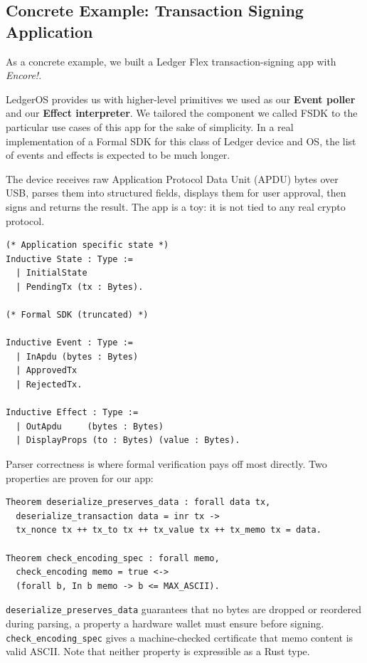 \documentclass[runningheads]{llncs}
\newcommand{\encore}{\textit{Encore!}}
\newcommand{\code}[1]{\texttt{#1}}
\begin{document}
\subsection{Concrete Example: Transaction Signing Application}

As a concrete example, we built a Ledger Flex transaction-signing app with \encore.

LedgerOS provides us with higher-level primitives we used as our \textbf{Event poller} and our \textbf{Effect interpreter}.
We tailored the component we called FSDK to the particular use cases of this app for the sake of simplicity.
In a real implementation of a Formal SDK for this class of Ledger device and OS, the list of events and effects is expected to be much longer.

The device receives raw Application Protocol Data Unit (APDU) bytes over USB, parses them into structured fields, displays them for user approval, then signs and returns the result.
The app is a toy: it is not tied to any real crypto protocol.

\begin{lstlisting}[language=Coq]
(* Application specific state *)
Inductive State : Type :=
  | InitialState
  | PendingTx (tx : Bytes).

(* Formal SDK (truncated) *)

Inductive Event : Type :=
  | InApdu (bytes : Bytes)
  | ApprovedTx
  | RejectedTx.

Inductive Effect : Type :=
  | OutApdu     (bytes : Bytes)
  | DisplayProps (to : Bytes) (value : Bytes).
\end{lstlisting}

Parser correctness is where formal verification pays off most directly.
Two properties are proven for our app:

\begin{lstlisting}[language=Coq]
Theorem deserialize_preserves_data : forall data tx,
  deserialize_transaction data = inr tx ->
  tx_nonce tx ++ tx_to tx ++ tx_value tx ++ tx_memo tx = data.

Theorem check_encoding_spec : forall memo,
  check_encoding memo = true <->
  (forall b, In b memo -> b <= MAX_ASCII).
\end{lstlisting}

\code{deserialize\_preserves\_data} guarantees that no bytes are dropped or reordered during parsing, a property a hardware wallet must ensure before signing.
\code{check\_encoding\_spec} gives a machine-checked certificate that memo content is valid ASCII.
Note that neither property is expressible as a Rust type.
\end{document}
